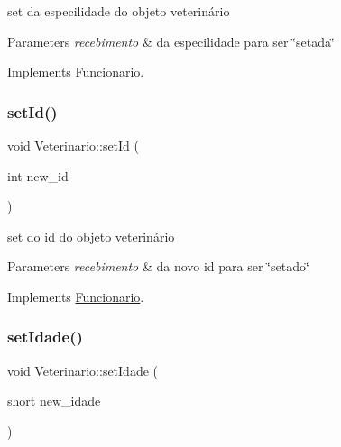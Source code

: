 set da especilidade do objeto veterinário 


\begin{DoxyParams}{Parameters}
{\em recebimento} & da especilidade para ser \char`\"{}setada\char`\"{} \\
\hline
\end{DoxyParams}


Implements \mbox{\hyperlink{class_funcionario}{Funcionario}}.

\mbox{\label{class_veterinario_a34e49acb7ff51961d3291ddf7a736a08}} 
\subsubsection{\texorpdfstring{setId()}{setId()}}
{\footnotesize\ttfamily void Veterinario\+::set\+Id (\begin{DoxyParamCaption}\item[{int}]{new\+\_\+id }\end{DoxyParamCaption})\hspace{0.3cm}{\ttfamily [virtual]}}



set do id do objeto veterinário 


\begin{DoxyParams}{Parameters}
{\em recebimento} & da novo id para ser \char`\"{}setado\char`\"{} \\
\hline
\end{DoxyParams}


Implements \mbox{\hyperlink{class_funcionario_aabcee2d8617c88ba10bb7b6f3f7f41ac}{Funcionario}}.

\mbox{\label{class_veterinario_ad8e5d38ff8cc23c0c13cc511c9d558c6}} 
\subsubsection{\texorpdfstring{setIdade()}{setIdade()}}
{\footnotesize\ttfamily void Veterinario\+::set\+Idade (\begin{DoxyParamCaption}\item[{short}]{new\+\_\+idade }\end{DoxyParamCaption})\hspace{0.3cm}{\ttfamily [virtual]}}




